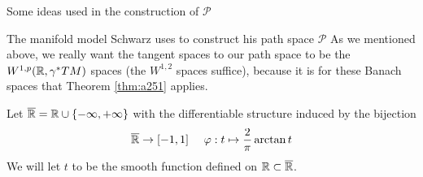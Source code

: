 \documentclass{amsart}
\begin{document}
\begin{clear}{Some ideas used in the construction of $\mathscr{P}$}
\end{clear}
\begin{clear}{The manifold model Schwarz uses to construct his path
    space $\mathscr{P}$}
  As we mentioned above, we really want the tangent spaces to our
  path space to be the $W^{1,p}(\mathbb{R},\gamma^{*}TM)$ spaces (the
  $W^{1,2}$ spaces suffice), because it is for these Banach spaces
  that Theorem \ref{thm:a251} applies.

  \begin{defn}
  Let $\overline{\mathbb{R}}=\mathbb{R}\cup\left\{-\infty,+\infty\right\}$ with the differentiable structure induced by the bijection
  \begin{equation*}
    \overline{\mathbb{R}}\to [-1,1]\ \ \ \ \varphi:t\mapsto \frac{2}{\pi}\arctan t
  \end{equation*}
  We will let $t$ to be the smooth function defined on $\mathbb{R}\subset \overline{\mathbb{R}}$.


\end{defn}
\end{clear}
\end{document}
